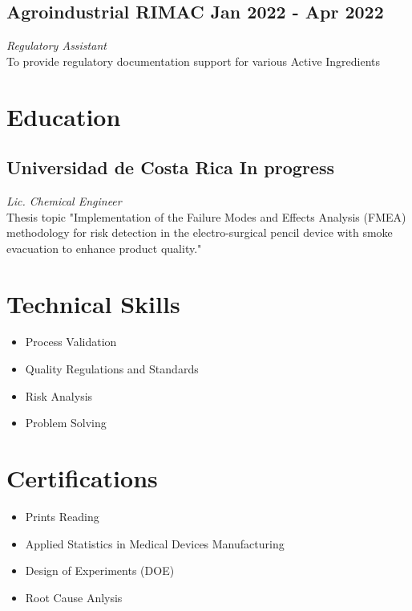 \documentclass[a4paper,10pt]{article}
\begin{document}
\subsection*{Agroindustrial RIMAC \hfill Jan 2022 - Apr 2022}
\textit{ Regulatory Assistant} \\
To provide regulatory documentation support for various Active Ingredients

\section*{ Education}

\subsection*{Universidad de Costa Rica \hfill In progress}
\textit{Lic. Chemical Engineer}\\
Thesis topic "Implementation of the Failure Modes and Effects Analysis (FMEA) methodology for risk detection in the electro-surgical pencil device with smoke evacuation to enhance product quality."

\section*{ Technical Skills}
\begin{center}
    \begin{itemize}[label=, itemsep=-3pt]
        \item Process Validation
        \item Quality Regulations and Standards
        \item Risk Analysis
        \item Problem Solving
    \end{itemize}
\end{center}

\section*{ Certifications}
\begin{itemize}[label=]
    \item Prints Reading
    \item Applied Statistics in Medical Devices Manufacturing
    \item Design of Experiments (DOE)
    \item Root Cause Anlysis
\end{itemize}
\end{document}

